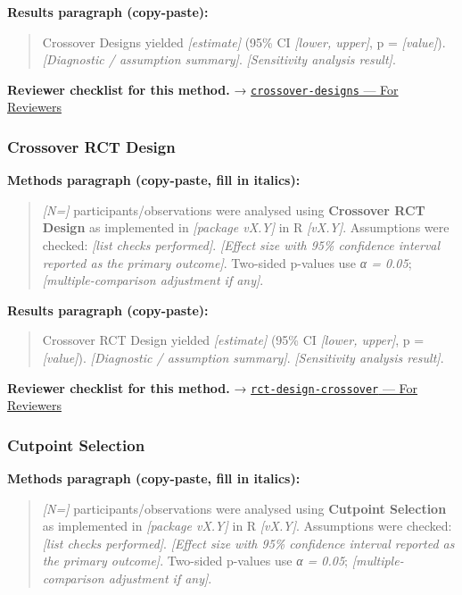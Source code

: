 \documentclass[
]{article}
\begin{document}
\textbf{Results paragraph (copy-paste):}

\begin{quote}
Crossover Designs yielded \emph{{[}estimate{]}} (95\% CI \emph{{[}lower,
upper{]}}, p = \emph{{[}value{]}}). \emph{{[}Diagnostic / assumption
summary{]}}. \emph{{[}Sensitivity analysis result{]}}.
\end{quote}

\textbf{Reviewer checklist for this method.} →
\href{../chapters/16-design/crossover-designs.Rmd\#for-reviewers}{\texttt{crossover-designs}
--- For Reviewers}

\subsubsection{Crossover RCT Design}\label{crossover-rct-design}

\textbf{Methods paragraph (copy-paste, fill in italics):}

\begin{quote}
\emph{{[}N={]}} participants/observations were analysed using
\textbf{Crossover RCT Design} as implemented in \emph{{[}package
vX.Y{]}} in R \emph{{[}vX.Y{]}}. Assumptions were checked: \emph{{[}list
checks performed{]}}. \emph{{[}Effect size with 95\% confidence interval
reported as the primary outcome{]}}. Two-sided p-values use \emph{α =
0.05}; \emph{{[}multiple-comparison adjustment if any{]}}.
\end{quote}

\textbf{Results paragraph (copy-paste):}

\begin{quote}
Crossover RCT Design yielded \emph{{[}estimate{]}} (95\% CI
\emph{{[}lower, upper{]}}, p = \emph{{[}value{]}}). \emph{{[}Diagnostic
/ assumption summary{]}}. \emph{{[}Sensitivity analysis result{]}}.
\end{quote}

\textbf{Reviewer checklist for this method.} →
\href{../chapters/14-clinical/rct-design-crossover.Rmd\#for-reviewers}{\texttt{rct-design-crossover}
--- For Reviewers}

\subsubsection{Cutpoint Selection}\label{cutpoint-selection}

\textbf{Methods paragraph (copy-paste, fill in italics):}

\begin{quote}
\emph{{[}N={]}} participants/observations were analysed using
\textbf{Cutpoint Selection} as implemented in \emph{{[}package vX.Y{]}}
in R \emph{{[}vX.Y{]}}. Assumptions were checked: \emph{{[}list checks
performed{]}}. \emph{{[}Effect size with 95\% confidence interval
reported as the primary outcome{]}}. Two-sided p-values use \emph{α =
0.05}; \emph{{[}multiple-comparison adjustment if any{]}}.
\end{quote}
\end{document}

